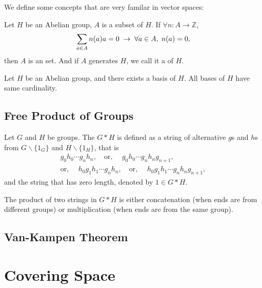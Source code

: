 \documentclass[openany, oneside, a5paper]{book}
\begin{document}
We define some concepts that are very familar in vector spaces:
\begin{definition}
    Let $H$ be an Abelian group, $A$ is a subset of $H$.
    If $\forall n \colon A \to \mathbb Z$, 
    \begin{equation*}
        \sum_{a \in A} n(a) a = 0
        \;\rightarrow\;
        \forall a \in A,\;
        n(a) = 0,
    \end{equation*}
    then $A$ is an  set.
    And if $A$ generates $H$, we call it a  of $H$.
\end{definition}

\begin{theorem}
    Let $H$ be an Abelian group, and there exists a basis of $H$.
    All bases of $H$ have same cardinality.
\end{theorem}

\section{Free Product of Groups}

\begin{definition}
    Let $G$ and $H$ be groups.
    The  $G * H$ is defined as a string of alternative $g$s and $h$s from $G \backslash \{1_G\}$ and $H \backslash \{1_H\}$, that is
    \begin{align*}
        g_0 h_0 \cdots g_n h_n,
        \quad
        \text{or, }
        \quad
        g_0 h_0 \cdots g_n h_n g_{n+1},
        \\
        \text{or, }
        \quad
        h_0 g_1 h_1 \cdots g_n h_n,
        \quad
        \text{or, }
        \quad
        h_0 g_1 h_1 \cdots g_n h_n g_{n+1},
    \end{align*}
    and the string that has zero length, denoted by $1 \in G * H$.

    The product of two strings in $G * H$ is either concatenation (when ends are from different groups) or multiplication (when ends are from the same group). 
\end{definition}

\section{Van-Kampen Theorem}

\chapter{Covering Space}
\end{document}
